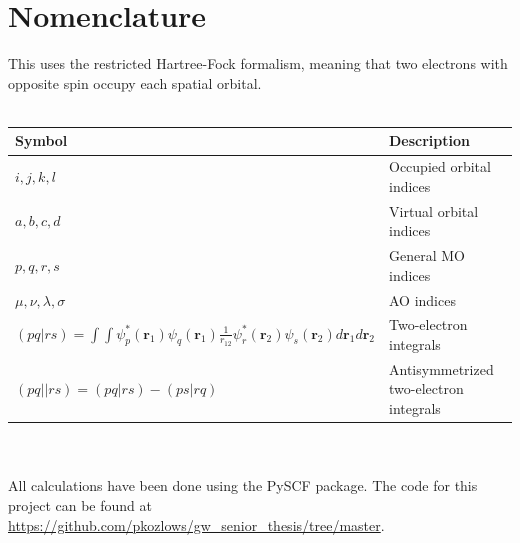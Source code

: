 \documentclass[12pt]{caltech_thesis}
\begin{document}
\chapter{Nomenclature}
This uses the restricted Hartree-Fock formalism, meaning that two electrons with opposite spin occupy each spatial orbital.\\\\
\begin{tabular}{p{} p{}}
Symbol & Description \\
\hline
\(i,j,k,l\) & Occupied orbital indices \\
\(a,b,c,d\) & Virtual orbital indices \\
\(p,q,r,s\) & General MO indices \\
\(\mu,\nu,\lambda,\sigma\) & AO indices \\
\((pq|rs) = \int \int \psi_p^*(\mathbf{r}_1)\psi_q(\mathbf{r}_1)\frac{1}{r_{12}}\psi_r^*(\mathbf{r}_2)\psi_s(\mathbf{r}_2)d\mathbf{r}_1d\mathbf{r}_2\) & Two-electron integrals \\
\((pq||rs) = (pq|rs) - (ps|rq)\) & Antisymmetrized two-electron integrals \\

\end{tabular}\\\\
All calculations have been done using the PySCF package.\autocite{sun_recent_2020} The code for this project can be found at \url{https://github.com/pkozlows/gw_senior_thesis/tree/master}.
\end{document}

